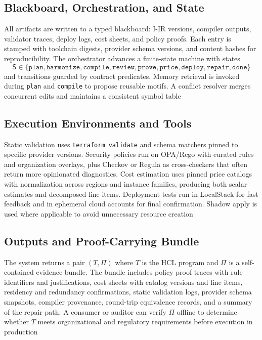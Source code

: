 \documentclass[manuscript,screen,nonacm]{acmart}
\begin{document}
\subsection{Blackboard, Orchestration, and State}
\label{sec:blackboard}

All artifacts are written to a typed blackboard: I-IR versions, compiler outputs, validator traces, deploy logs, cost sheets, and policy proofs. Each entry is stamped with toolchain digests, provider schema versions, and content hashes for reproducibility. The orchestrator advances a finite-state machine with states
\begin{equation}
\mathsf{S} \in \{\texttt{plan},\texttt{harmonize},\texttt{compile},\texttt{review},\texttt{prove},\texttt{price},\texttt{deploy},\texttt{repair},\texttt{done}\}
\end{equation}
and transitions guarded by contract predicates. Memory retrieval is invoked during \texttt{plan} and \texttt{compile} to propose reusable motifs. A conflict resolver merges concurrent edits and maintains a consistent symbol table

\subsection{Execution Environments and Tools}
\label{sec:env}

Static validation uses \texttt{terraform validate} and schema matchers pinned to specific provider versions. Security policies run on OPA/Rego with curated rules and organization overlays, plus Checkov or Regula as cross-checkers that often return more opinionated diagnostics. Cost estimation uses pinned price catalogs with normalization across regions and instance families, producing both scalar estimates and decomposed line items. Deployment tests run in LocalStack for fast feedback and in ephemeral cloud accounts for final confirmation. Shadow apply is used where applicable to avoid unnecessary resource creation

\subsection{Outputs and Proof-Carrying Bundle}
\label{sec:outputs}

The system returns a pair $(T,\Pi)$ where $T$ is the HCL program and $\Pi$ is a self-contained evidence bundle. The bundle includes policy proof traces with rule identifiers and justifications, cost sheets with catalog versions and line items, residency and redundancy confirmations, static validation logs, provider schema snapshots, compiler provenance, round-trip equivalence records, and a summary of the repair path. A consumer or auditor can verify $\Pi$ offline to determine whether $T$ meets organizational and regulatory requirements before execution in production
\end{document}
